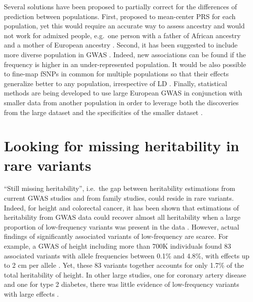 Several solutions have been proposed to partially correct for the differences of prediction between populations. First, \cite{martin2017human} proposed to mean-center PRS for each population, yet this would require an accurate way to assess ancestry and would not work for admixed people, e.g.\ one person with a father of African ancestry and a mother of European ancestry \cite[]{reisberg2017comparing}.
Second, it has been suggested to include more diverse population in GWAS \cite[]{pulit2010multiethnic}. Indeed, new associations can be found if the frequency is higher in an under-represented population. 
It would be also possible to fine-map fSNPs in common for multiple populations so that their effects generalize better to any population, irrespective of LD \cite[]{carlson2013generalization,finemap,wojcik2018page}.
Finally, statistical methods are being developed to use large European GWAS in conjunction with smaller data from another population in order to leverage both the discoveries from the large dataset and the specificities of the smaller dataset \cite[]{marquez2017multiethnic,coram2017leveraging}.


\section{Looking for missing heritability in rare variants}

``Still missing heritability'', i.e.\ the gap between heritability estimations from current GWAS studies and from family studies, could reside in rare variants.
Indeed, for height and colorectal cancer, it has been shown that estimations of heritability from GWAS data could recover almost all heritability when a large proportion of low-frequency variants was present in the data \cite[]{yang2015genetic,huyghe2019discovery,wainschtein2019recovery}.
However, actual findings of significantly associated variants of low-frequency are scarce. 
For example, a GWAS of height including more than 700K individuals found 83 associated variants with allele frequencies between 0.1\% and 4.8\%, with effects up to 2 cm per allele \cite[]{marouli2017rare}. Yet, these 83 variants together accounts for only 1.7\% of the total heritability of height. 
In other large studies, one for coronary artery disease and one for type 2 diabetes, there was little evidence of low-frequency variants with large effects \cite[]{nikpay2015comprehensive,fuchsberger2016genetic}.


